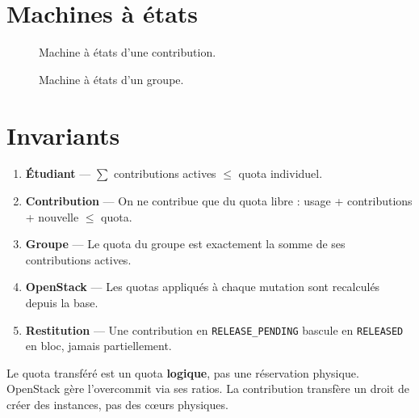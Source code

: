 \section{Machines à états}
\begin{figure}[H]
\centering\vspace{2pt}

\caption{Machine à états d'une contribution.}
\label{fig:etat-contribution}
\end{figure}

\begin{figure}[H]
\centering\vspace{2pt}

\caption{Machine à états d'un groupe.}
\label{fig:etat-groupe}
\end{figure}

\section{Invariants}
\begin{enumerate}
  \item \textbf{Étudiant} — $\sum$ contributions actives $\leq$ quota individuel.
  \item \textbf{Contribution} — On ne contribue que du quota libre : usage + contributions + nouvelle $\leq$ quota.
  \item \textbf{Groupe} — Le quota du groupe est exactement la somme de ses contributions actives.
  \item \textbf{OpenStack} — Les quotas appliqués à chaque mutation sont recalculés depuis la base.
  \item \textbf{Restitution} — Une contribution en \texttt{RELEASE\_PENDING} bascule en \texttt{RELEASED} en bloc, jamais partiellement.
\end{enumerate}

\begin{infobox}
Le quota transféré est un quota \textbf{logique}, pas une réservation physique. OpenStack gère l'overcommit via ses ratios. La contribution transfère un droit de créer des instances, pas des cœurs physiques.
\end{infobox}

